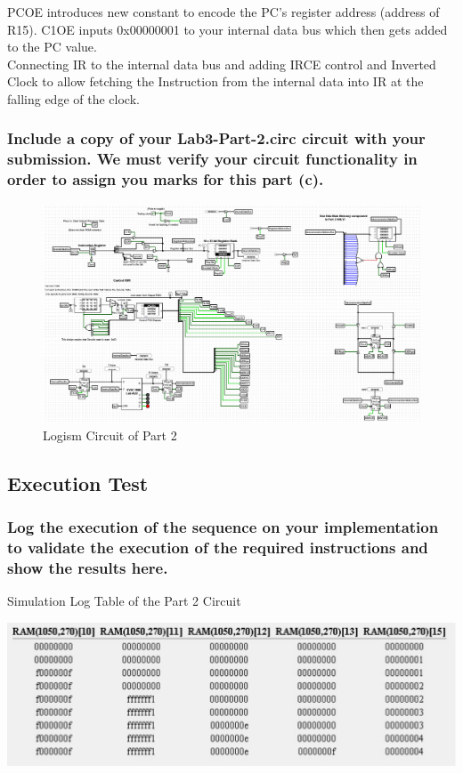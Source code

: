 \documentclass{article}
\begin{document}
	PCOE introduces new constant to encode the PC's register address (address of R15).
	C1OE inputs 0x00000001 to your internal data bus which then gets added to the PC value.\\

	Connecting IR to the internal data bus and adding IRCE control and Inverted Clock to allow fetching the Instruction from the internal data into IR at the falling edge of the clock.

	\subsubsection{Include a copy of your Lab3-Part-2.circ circuit with your submission. We must verify your circuit functionality in order to assign you marks for this part (c).}
	\begin{figure}[!ht]
		\centering
		\includegraphics[width=\linewidth]{circuit_part2.png}
		\caption{Logism Circuit of Part 2}
	\end{figure}

	\subsection{Execution Test}
	\subsubsection{Log the execution of the sequence on your implementation to validate the execution of the required instructions and show the results here.}
	\begin{table}[!ht]
		\centering
		\caption{Simulation Log Table of the Part 2 Circuit}
		\vspace{0.2cm}
		\includegraphics[width=\linewidth]{log_sim_table_part2.png}		
	\end{table}	
	
\end{document}
